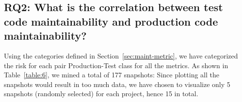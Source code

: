 
\subsection*{RQ2: What is the correlation between test code maintainability and production code maintainability?}
\label{maintainability:correlation}
Using the categories defined in Section~\ref{sec:maint-metric}, we have categorized the risk for each pair Production-Test class for all the metrics. As shown in Table~\ref{table:6}, we mined a total of 177 snapshots: Since plotting all the snapshots would result in too much data, we have chosen to visualize only 5 snapshots (randomly selected) for each project, hence 15 in total. 

